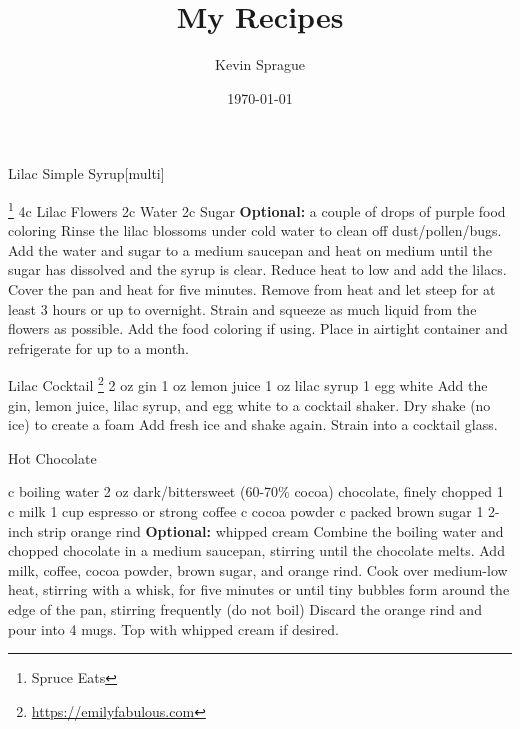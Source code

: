 \documentclass[12pt]{cookbook}
\title{My Recipes}
\author{Kevin Sprague}
\date{\today}
\begin{document}
\begin{recipe}{Lilac Simple Syrup}[multi]

\footnote{Spruce Eats}
\ingredients
	{4c Lilac Flowers}
	{2c Water}
	{2c Sugar}
	{\textbf{Optional:} a couple of drops of purple food coloring}
\stopingredients
\preparation
	{Rinse the lilac blossoms under cold water to clean off dust/pollen/bugs.}
	{Add the water and sugar to a medium saucepan and heat on medium until the sugar has dissolved and the syrup is clear.}
	{Reduce heat to low and add the lilacs. Cover the pan and heat for five minutes.}
	{Remove from heat and let steep for at least 3 hours or up to overnight.}
	{Strain and squeeze as much liquid from the flowers as possible.}
	{Add the food coloring if using.}
	{Place in airtight container and refrigerate for up to a month.}
\stopprep
\end{recipe}
\begin{recipe}{Lilac Cocktail}
\footnote{\url{https://emilyfabulous.com}}
\ingredients
    {2 oz gin}
    {1 oz lemon juice}
    {1 oz lilac syrup}
    {1 egg white}
\stopingredients
\preparation
    {Add the gin, lemon juice, lilac syrup, and egg white to a cocktail shaker. Dry shake (no ice) to create a foam}
    {Add fresh ice and shake again.}
    {Strain into a cocktail glass.}
\stopprep
\end{recipe}
\begin{recipe}{Hot Chocolate}
\begin{center}
\end{center}
\ingredients
    { c boiling water}
    {2 oz dark/bittersweet (60-70\% cocoa) chocolate, finely chopped}
    {1  c milk}
    {1 cup espresso or strong coffee}
    { c cocoa powder}
    { c packed brown sugar}
    {1 2-inch strip orange rind}
    {\textbf{Optional:} whipped cream}
\stopingredients
\preparation
    {Combine the boiling water and chopped chocolate in a medium saucepan, stirring until the chocolate melts.}
    {Add milk, coffee, cocoa powder, brown sugar, and orange rind. Cook over medium-low heat, stirring with a whisk, for five minutes or until tiny bubbles form around the edge of the pan, stirring frequently (do not boil)}
    {Discard the orange rind and pour into 4 mugs.}
    {Top with whipped cream if desired.}
\stopprep
\end{recipe}
\end{document}
